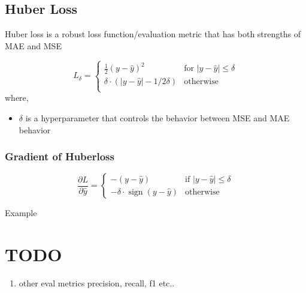 \documentclass[12pt]{extarticle}
\begin{document}
\subsection{Huber Loss}
Huber loss is a robust loss function/evaluation metric that has both strengths of MAE and MSE


$$
L_\delta = 
\begin{cases} 
    \frac{1}{2}(y-\hat{y})^2 & \text{for }|y-\hat{y}| \le \delta \\
    \delta \cdot (|y-\hat{y}|-1/2 \delta) & \text{otherwise} \\
\end{cases}
$$
where, 
\begin{itemize}
    \item \( \delta \) is a hyperparameter that controls the behavior between 
        MSE and MAE behavior
\end{itemize}

\subsubsection{Gradient of Huberloss}

\[
\frac{\partial L}{\partial \hat{y}} =
\begin{cases}
-(y - \hat{y}) & \text{if } |y - \hat{y}| \leq \delta \\
-\delta \cdot \operatorname{sign}(y - \hat{y}) & \text{otherwise}
\end{cases}
\]

Example




\section{TODO}
\begin{enumerate}
    \item other eval metrics precision, recall, f1 etc..

\end{enumerate}
\end{document}
